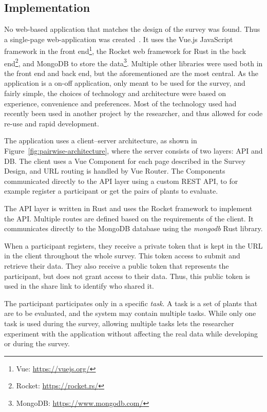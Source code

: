 \subsection{Implementation}
No web-based application that matches the design of the survey was found.
Thus a single-page web-application was created~\cite{CodePairwise}.
It uses the Vue.js JavaScript framework in the front end\footnote{Vue: \url{https://vuejs.org/}}, the Rocket web framework for Rust in the back end\footnote{Rocket: \url{https://rocket.rs/}}, and MongoDB to store the data\footnote{MongoDB: \url{https://www.mongodb.com/}}.
Multiple other libraries were used both in the front end and back end, but the aforementioned are the most central.
As the application is a on-off application, only meant to be used for the survey, and fairly simple, the choices of technology and architecture were based on experience, convenience and preferences.
Most of the technology used had recently been used in another project by the researcher, and thus allowed for code re-use and rapid development.

The application uses a client--server architecture, as shown in Figure~\ref{fig:pairwise-architecture}, where the server consists of two layers: API and DB.
The client uses a Vue Component for each page described in the Survey Design, and URL routing is handled by Vue Router.
The Components communicated directly to the API layer using a custom REST API, to for example register a participant or get the pairs of plants to evaluate.

The API layer is written in Rust and uses the Rocket framework to implement the API.
Multiple routes are defined based on the requirements of the client.
It communicates directly to the MongoDB database using the \textit{mongodb} Rust library.

When a participant registers, they receive a private token that is kept in the URL in the client throughout the whole survey.
This token access to submit and retrieve their data.
They also receive a public token that represents the participant, but does not grant access to their data.
Thus, this public token is used in the share link to identify who shared it.

The participant participates only in a specific \textit{task}.
A task is a set of plants that are to be evaluated, and the system may contain multiple tasks.
While only one task is used during the survey, allowing multiple tasks lets the researcher experiment with the application without affecting the real data while developing or during the survey.


